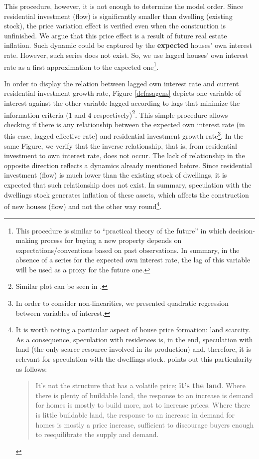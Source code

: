\documentclass[12pt, a4]{article}
\begin{document}
This procedure, however, it is not enough to determine the model order. 
Since residential investment (flow) is significantly smaller than dwelling (existing stock), the price variation effect  is verified even when the construction is unfinished. 
We argue that this price effect is a result of future real estate inflation.
Such dynamic could be captured by the \textbf{expected} houses' own interest rate.
However, such series does not exist. So, we use lagged houses' own interest rate as a first approximation to the expected one\footnote{This procedure is similar to \textcite{keynes_general_1937} ``practical theory of the future'' in which decision-making process for buying a new property depends on expectations/conventions based on past observations. 
In summary, in the absence of a series for the expected own interest rate, the lag of this variable will be used as a proxy for the future one.}.

In order to display the relation between lagged own interest rate and current residential investment growth rate, Figure \ref{defasagens} depicts one variable of interest against the other variable lagged according to lags that minimize the information criteria (1 and 4 respectively)\footnote{Similar plot can be seen in \textcite[p.~16]{girardi_autonomous_2015}.}.
This simple procedure allows checking if there is any relationship between the expected own interest rate (in this case, lagged effective rate) and residential investment growth rate\footnote{In order to consider non-linearities, we presented quadratic regression between variables of interest.}.
In the same Figure, we verify that the inverse relationship, that is, from residential investment to own interest rate, does not occur. 
The lack of relationship in the opposite direction reflects a dynamics already mentioned before.
Since residential investment (flow) is much lower than the existing stock of dwellings, it is expected that such relationship does not exist.
In summary, speculation with the dwellings stock generates inflation of these assets, which affects the construction of new houses (flow) and not the other way round\footnote{It is worth noting a particular aspect of house price formation: land scarcity. As a consequence, speculation with residences is, in the end, speculation with land (the only scarce resource involved in its production) and, therefore, it is relevant for speculation with the dwellings stock. 
	\textcite[p.~349, emphasis added]{leamer_housing_2007} points out this particularity as follows:
	\begin{quotation}
		It’s not the structure that has a volatile price; \textbf{it's the land}. Where there is plenty of buildable land, the response to an increase is demand for homes is mostly to build more, not to increase prices. Where there is little buildable land, the response to an increase in demand for homes is mostly a price increase, sufficient to discourage buyers enough to reequilibrate the supply and demand.
	\end{quotation}}.
\end{document}
